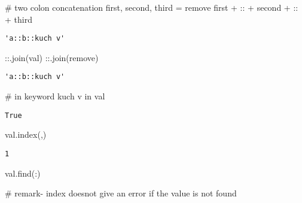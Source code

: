 \documentclass[
  letterpaper,
  DIV=11,
  numbers=noendperiod]{scrreprt}
\newenvironment{Shaded}{\begin{snugshade}}{\end{snugshade}}
\newcommand{\CommentTok}[1]{\textcolor[rgb]{0.37,0.37,0.37}{#1}}
\newcommand{\KeywordTok}[1]{\textcolor[rgb]{0.00,0.23,0.31}{#1}}
\newcommand{\NormalTok}[1]{\textcolor[rgb]{0.00,0.23,0.31}{#1}}
\newcommand{\OperatorTok}[1]{\textcolor[rgb]{0.37,0.37,0.37}{#1}}
\newcommand{\StringTok}[1]{\textcolor[rgb]{0.13,0.47,0.30}{#1}}
\begin{document}
\begin{Shaded}
\begin{Highlighting}[]
\CommentTok{\# two colon concatenation}
\NormalTok{first, second, third }\OperatorTok{=}\NormalTok{ remove}
\NormalTok{first }\OperatorTok{+} \StringTok{\textquotesingle{}::\textquotesingle{}} \OperatorTok{+}\NormalTok{ second }\OperatorTok{+} \StringTok{\textquotesingle{}::\textquotesingle{}} \OperatorTok{+}\NormalTok{ third}
\end{Highlighting}
\end{Shaded}

\begin{verbatim}
'a::b::kuch v'
\end{verbatim}

\begin{Shaded}
\begin{Highlighting}[]
\CommentTok{\textquotesingle{}::\textquotesingle{}}\NormalTok{.join(val)}
\CommentTok{\textquotesingle{}::\textquotesingle{}}\NormalTok{.join(remove)}
\end{Highlighting}
\end{Shaded}

\begin{verbatim}
'a::b::kuch v'
\end{verbatim}

\begin{Shaded}
\begin{Highlighting}[]
\CommentTok{\# in keyword}
\CommentTok{\textquotesingle{}kuch v\textquotesingle{}} \KeywordTok{in}\NormalTok{ val}
\end{Highlighting}
\end{Shaded}

\begin{verbatim}
True
\end{verbatim}

\begin{Shaded}
\begin{Highlighting}[]
\NormalTok{val.index(}\StringTok{\textquotesingle{},\textquotesingle{}}\NormalTok{)}
\end{Highlighting}
\end{Shaded}

\begin{verbatim}
1
\end{verbatim}

\begin{Shaded}
\begin{Highlighting}[]
\NormalTok{val.find(}\StringTok{\textquotesingle{}:\textquotesingle{}}\NormalTok{)}

\CommentTok{\# remark{-} index doesnot give an error if the value is not found}
\end{Highlighting}
\end{Shaded}
\end{document}
